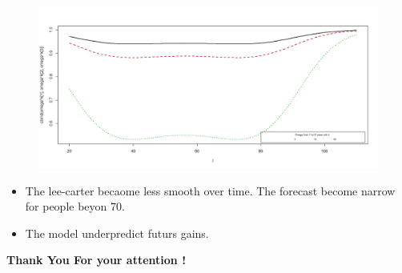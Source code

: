 \documentclass{beamer}
\begin{document}
\begin{figure}
  \centering
   \includegraphics[scale=0.26]{reduction_factor.jpeg}
  
\end{figure}

\begin{frame}


\begin{itemize}
 \item The lee-carter becaome less smooth over time. The forecast become narrow for people beyon 70.
 \item The model underpredict futurs gains. 
\end{itemize}

\end{frame}



\begin{frame}

\hspace{30mm} {\textbf{Thank You For your attention !}}

\end{frame}
\end{document}

